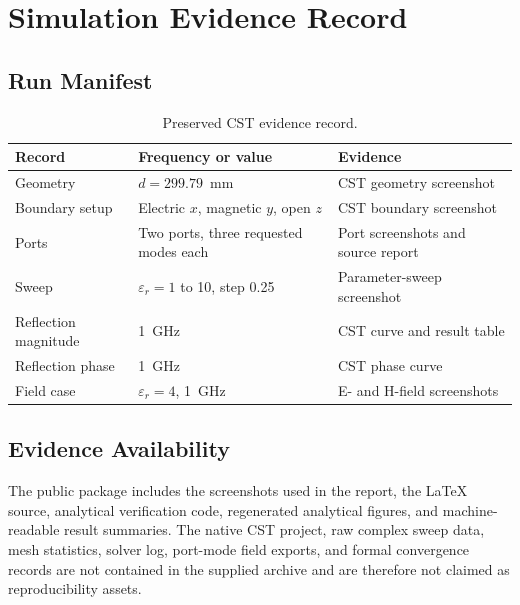 \chapter{Simulation Evidence Record}
\label{app:simulation-record}

\section{Run Manifest}

\begin{table}[H]
\centering
\caption{Preserved CST evidence record.}
\label{tab:run-manifest}
\begin{tabularx}{\textwidth}{@{}p{}p{}X@{}}
\toprule
\textbf{Record} & \textbf{Frequency or value} & \textbf{Evidence} \\
\midrule
Geometry & $d=299.79$~mm & CST geometry screenshot \\
Boundary setup & Electric $x$, magnetic $y$, open $z$ & CST boundary screenshot \\
Ports & Two ports, three requested modes each & Port screenshots and source report \\
Sweep & $\varepsilon_r=1$ to 10, step 0.25 & Parameter-sweep screenshot \\
Reflection magnitude & 1~GHz & CST curve and result table \\
Reflection phase & 1~GHz & CST phase curve \\
Field case & $\varepsilon_r=4$, 1~GHz & E- and H-field screenshots \\
\bottomrule
\end{tabularx}
\end{table}

\section{Evidence Availability}

The public package includes the screenshots used in the report, the LaTeX source,
analytical verification code, regenerated analytical figures, and machine-readable
result summaries. The native CST project, raw complex sweep data, mesh statistics,
solver log, port-mode field exports, and formal convergence records are not contained
in the supplied archive and are therefore not claimed as reproducibility assets.
